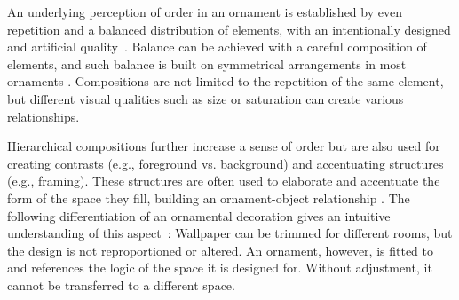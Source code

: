 

An underlying perception of order in an ornament is established by even repetition and a balanced distribution of elements, with an intentionally designed and artificial quality~\cite{ward_1896_tpo}. Balance can be achieved with a careful composition of elements, and such balance is built on symmetrical arrangements in most ornaments \cite{gieseke_2017_ooo}. Compositions are not limited to the repetition of the same element, but different visual qualities such as size or saturation can create various relationships. 


Hierarchical compositions further increase a sense of order but are also used for creating contrasts (e.g., foreground vs. background) and accentuating structures (e.g., framing). These structures are often used to elaborate and accentuate the form of the space they fill, building an ornament-object relationship \cite{arbruzzo_2006_dec}. The following differentiation of an ornamental decoration gives an intuitive understanding of this aspect~\cite{arbruzzo_2006_dec}: Wallpaper can be trimmed for different rooms, but the design is not reproportioned or altered. An ornament, however, is fitted to and references the logic of the space it is designed for. Without adjustment, it cannot be transferred to a different space.

